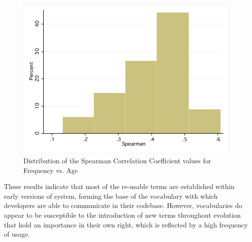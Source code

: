 \begin{figure}[t]
\centering
\includegraphics[width=\textwidth]{Figures/Vocab-FrequencyAgeSpearmanDist.pdf}
\caption{Distribution of the Spearman Correlation Coefficient values for Frequency vs. Age}
\label{fig:vocab-freqage-spearman-dist}
\end{figure}

These results indicate that most of the re-usable terms are established within early versions of system, forming the base of the vocabulary with which developers are able to communicate in their codebase. However, vocabularies do appear to be susceptible to the introduction of new terms throughout evolution that hold an importance in their own right, which is reflected by a high frequency of usage.





